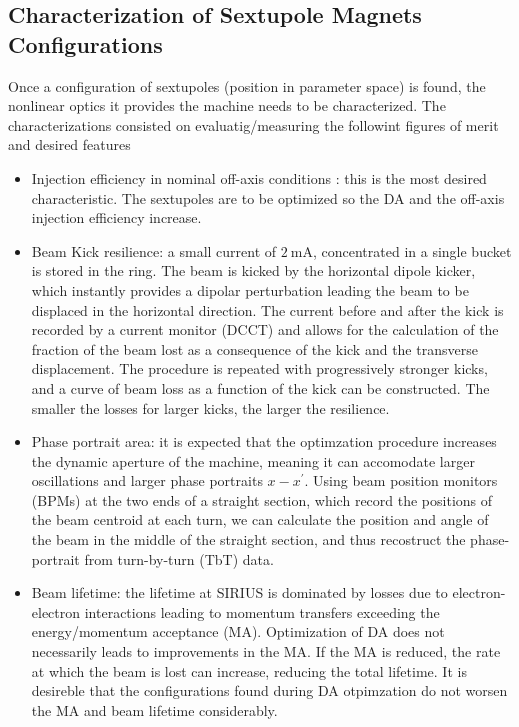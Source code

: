 \subsection{Characterization of Sextupole Magnets Configurations}
Once a configuration of sextupoles (position in parameter space) is found, the nonlinear optics it provides the machine needs to be characterized. The characterizations consisted on evaluatig/measuring the followint figures of merit and desired features
\begin{itemize}
    \item Injection efficiency in nominal off-axis conditions : this is the most desired characteristic. The sextupoles are to be optimized so the DA and the off-axis injection efficiency increase.
    \item Beam Kick resilience: a small current of $2~\unit{\milli\ampere}$, concentrated in a single bucket is stored in the ring. The beam is kicked by the horizontal dipole kicker, which instantly provides a dipolar perturbation leading the beam to be displaced in the horizontal direction. The current before and after the kick is recorded by a current monitor (DCCT) and allows for the calculation of the fraction of the beam lost as a consequence of the kick and the transverse displacement. The procedure is repeated with progressively stronger kicks, and a curve of beam loss as a function of the kick can be constructed. The smaller the losses for larger kicks, the larger the resilience.
    \item Phase portrait area: it is expected that the optimzation procedure increases the dynamic aperture of the machine, meaning it can accomodate larger oscillations and larger phase portraits $x-x^\prime$. Using beam position monitors (BPMs) at the two ends of a straight section, which record the positions of the beam centroid at each turn, we can calculate the position and angle of the beam in the middle of the straight section, and thus recostruct the phase-portrait from turn-by-turn (TbT) data.
    \item Beam lifetime: the lifetime at SIRIUS is dominated by losses due to electron-electron interactions leading to momentum transfers exceeding the energy/momentum acceptance (MA). Optimization of DA does not necessarily leads to improvements in the MA. If the MA is reduced, the rate at which the beam is lost can increase, reducing the total lifetime. It is desireble that the configurations found during DA otpimzation do not worsen the MA and beam lifetime considerably.

\end{itemize}
